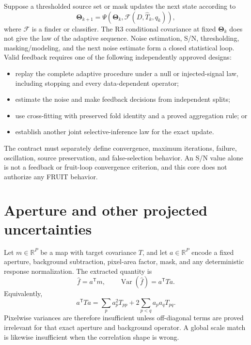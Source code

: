 \documentclass[11pt]{article}
\newcommand{\Var}{\operatorname{Var}}
\newcommand{\ThetaV}{\boldsymbol{\Theta}}
\begin{document}
Suppose a thresholded source set or mask updates the next state according to
\begin{equation}
  \ThetaV_{k+1}
  =\Psi\!\left(\ThetaV_k,
    \mathcal F(D,\widehat T_k,q_k)\right),
  \label{eq:feedback-map}
\end{equation}
where $\mathcal F$ is a finder or classifier.  The R3 conditional covariance
at fixed $\ThetaV_k$ does not give the law of the adaptive sequence.  Noise
estimation, S/N, thresholding, masking/modeling, and the next noise estimate
form a closed statistical loop.  Valid feedback requires one of the following
independently approved designs:
\begin{itemize}
\item replay the complete adaptive procedure under a null or injected-signal
law, including stopping and every data-dependent operator;
\item estimate the noise and make feedback decisions from independent splits;
\item use cross-fitting with preserved fold identity and a proved aggregation
rule; or
\item establish another joint selective-inference law for the exact update.
\end{itemize}
The contract must separately define convergence, maximum iterations, failure,
oscillation, source preservation, and false-selection behavior.  An S/N value
alone is not a feedback or fruit-loop convergence criterion, and this core
does not authorize any FRUIT behavior.

\section{Aperture and other projected uncertainties}

Let $m\in\mathbb R^P$ be a map with target covariance $T$, and let
$a\in\mathbb R^P$ encode a fixed aperture, background subtraction, pixel-area
factor, mask, and any deterministic response normalization.  The extracted
quantity is
\begin{equation}
  \widehat f=a^{\mathsf T}m,
  \qquad
  \Var(\widehat f)=a^{\mathsf T}Ta.
  \label{eq:aperture-variance}
\end{equation}
Equivalently,
\begin{equation}
  a^{\mathsf T}Ta
  =\sum_pa_p^2T_{pp}
   +2\sum_{p<q}a_pa_qT_{pq}.
  \label{eq:aperture-cross-terms}
\end{equation}
Pixelwise variances are therefore insufficient unless off-diagonal terms are
proved irrelevant for that exact aperture and background operator.  A global
scale match is likewise insufficient when the correlation shape is wrong.
\end{document}
